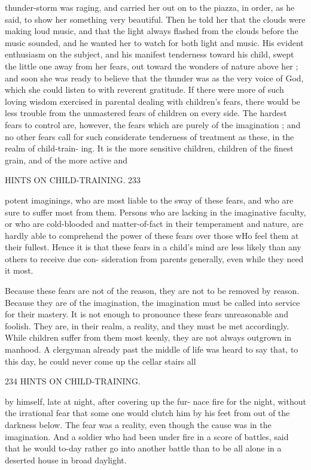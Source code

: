 \documentclass[
]{book}
\begin{document}
thunder-storm was raging, and carried her out on to the piazza, in order, as he said, to show her something very beautiful. Then he told her that the clouds were making loud music, and that the light always flashed from the clouds before the music sounded, and he wanted her to watch for both light and music. His evident enthusiasm on the subject, and his manifest tenderness toward his child, swept the little one away from her fears, out toward the wonders of nature above her ; and soon she was ready to believe that the thunder was as the very voice of God, which she could listen to with reverent gratitude. If there were more of such loving wisdom exercised in parental dealing with children's fears, there would be less trouble from the unmastered fears of children on every side. The hardest fears to control are, however, the fears which are purely of the imagination ; and no other fears call for such considerate tenderness of treatment as these, in the realm of child-train- ing. It is the more sensitive children, children of the finest grain, and of the more active and

HINTS ON CHILD-TRAINING. 233

potent imaginings, who are most liable to the sway of these fears, and who are sure to suffer most from them. Persons who are lacking in the imaginative faculty, or who are cold-blooded and matter-of-fact in their temperament and nature, are hardly able to comprehend the power of these fears over those wHo feel them at their fullest. Hence it is that these fears in a child's mind are less likely than any others to receive due con- sideration from parents generally, even while they need it most.

Because these fears are not of the reason, they are not to be removed by reason. Because they are of the imagination, the imagination must be called into service for their mastery. It is not enough to pronounce these fears unreasonable and foolish. They are, in their realm, a reality, and they must be met accordingly. While children suffer from them most keenly, they are not always outgrown in manhood. A clergyman already past the middle of life was heard to say that, to this day, he could never come up the cellar stairs all

234 HINTS ON CHILD-TRAINING.

by himself, late at night, after covering up the fur- nace fire for the night, without the irrational fear that some one would clutch him by his feet from out of the darkness below. The fear was a reality, even though the cause was in the imagination. And a soldier who had been under fire in a score of battles, said that he would to-day rather go into another battle than to be all alone in a deserted house in broad daylight.
\end{document}
